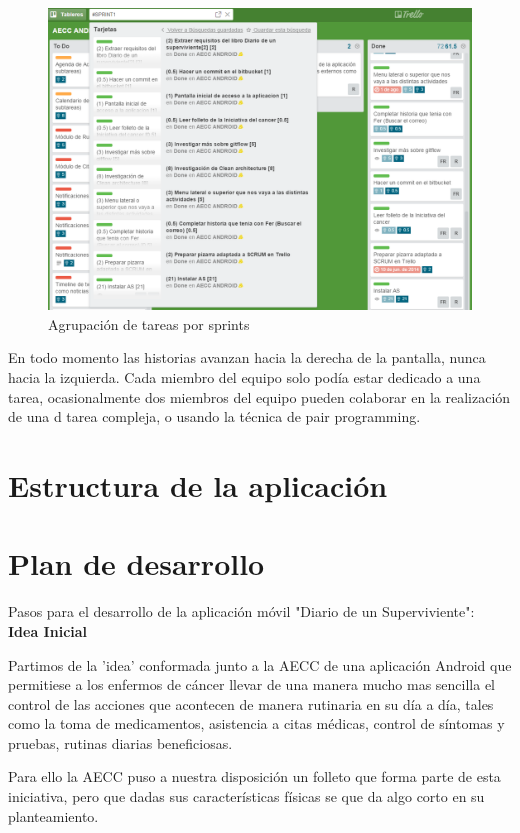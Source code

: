 \documentclass[../pfc.tex]{subfiles}
\begin{document}
		
		\begin{figure}[H]
			\centering
			\includegraphics[width=0.7\linewidth]{../images/sprints2}
			\caption{Agrupación de tareas por sprints}
			\label{fig:sprints}
		\end{figure}

En todo momento las historias avanzan hacia la derecha de la pantalla, nunca hacia la izquierda. Cada miembro del equipo solo podía estar dedicado a una tarea, ocasionalmente dos miembros del equipo pueden colaborar en la realización de una d
tarea compleja, o usando la técnica de pair programming. 
	
	\section{Estructura de la aplicación}
	
	\section{Plan de desarrollo}
	Pasos para el desarrollo de la aplicación móvil "Diario de un Superviviente":\\
	
	\textbf{Idea Inicial}
	
	Partimos de la 'idea' conformada junto a la AECC de una aplicación Android  que permitiese a los enfermos de cáncer llevar de una manera mucho mas sencilla el control de las acciones que acontecen de manera rutinaria en su día a día, tales como la toma de medicamentos, asistencia a citas médicas, control de síntomas y pruebas, rutinas diarias beneficiosas.
	
	Para ello la AECC puso a nuestra disposición un folleto que forma parte de esta iniciativa, pero que dadas sus características físicas se que da algo corto en su planteamiento.\\
	
\end{document}
